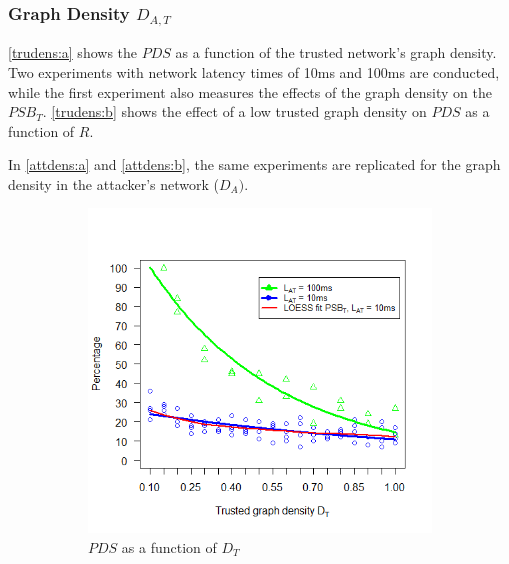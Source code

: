 \documentclass[a4paper,12pt,twoside]{report}
\begin{document}
\subsubsection{Graph Density $D_{A,T}$}
\autoref{trudens:a} shows the $PDS$ as a function of the trusted network's graph density. Two experiments with network latency times of 10ms and 100ms are conducted, while the first experiment also measures the effects of the graph density on the $PSB_T$. \autoref{trudens:b} shows the effect of a low trusted graph density on $PDS$ as a function of $R$.

In \autoref{attdens:a} and \autoref{attdens:b}, the same experiments are replicated for the graph density in the attacker's network ($D_{A})$.

\begin{figure}[!ht]
\centering
\begin{subfigure}{.5\textwidth}
  \centering
  \includegraphics[width=\linewidth]{Experiments/TruDensity/trudens.png}
  \caption{$PDS$ as a function of $D_{T}$}
  \label{trudens:a}
\end{subfigure}%
\begin{subfigure}{.5\textwidth}
  \centering

\end{subfigure}
\end{figure}
\end{document}
